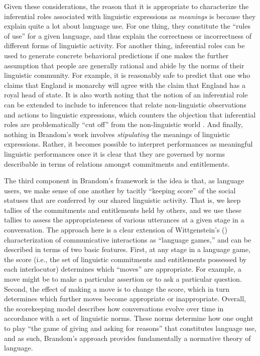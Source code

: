 Given these considerations, the reason that it is appropriate to characterize the inferential roles associated with linguistic expressions as \textit{meanings} is because they explain quite a lot about language use. For one thing, they constitute the ``rules of use'' for a given language, and thus explain the correctness or incorrectness of different forms of linguistic activity. For another thing, inferential roles can be used to generate concrete behavioral predictions if one makes the further assumption that people are generally rational and abide by the norms of their linguistic community. For example, it is reasonably safe to predict that one who claims that England is monarchy will agree with the claim that England has a royal head of state. It is also worth noting that the notion of an inferential role can be extended to include to inferences that relate non-linguistic observations and actions to linguistic expressions, which counters the objection that inferential roles are problematically ``cut off'' from the non-linguistic world \citep[see][pp. 199-271]{Brandom:1994}. And finally, nothing in Brandom's work involves \textit{stipulating} the meanings of linguistic expressions. Rather, it becomes possible to interpret performances as meaningful linguistic performances once it is clear that they are governed by norms describable in terms of relations amongst commitments and entitlements.

The third component in Brandom's framework is the idea is that, as language users, we make sense of one another by tacitly ``keeping score'' of the social statuses that are conferred by our shared linguistic activity. That is, we keep tallies of the commitments and entitlements held by others, and we use these tallies to assess the appropriateness of various utterances at a given stage in a conversation. The approach here is a clear extension of Wittgenstein's (\citeyear{Wittgenstein:1953}) characterization of communicative interactions as ``language games,'' and can be described in terms of two basic features. First, at any stage in a language game, the score (i.e., the set of linguistic commitments and entitlements possessed by each interlocutor) determines which ``moves'' are appropriate. For example, a move might be to make a particular assertion or to ask a particular question. Second, the effect of making a move is to change the score, which in turn determines which further moves become appropriate or inappropriate. Overall, the scorekeeping model describes how conversations evolve over time in accordance with a set of linguistic norms. These norms determine how one ought to play ``the game of giving and asking for reasons'' \citep[][p. 23]{Brandom:1994} that constitutes language use, and as such, Brandom's approach provides fundamentally a normative theory of language.

